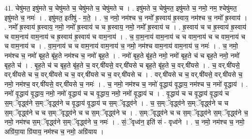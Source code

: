 \documentclass[17pt]{extarticle}
\begin{document}
41. चेषु॑मत॒ इषु॑मते च॒ चेषु॑मते च॒ चेषु॑मते च॒ चेषु॑मते च । . इषु॑मते च॒ चेषु॑मत॒ इषु॑मते च॒ नमो॒ नम॒ श्चेषु॑मत॒ इषु॑मते च॒ नमः॑ । . इषु॑मत॒ इतीषु॑ - म॒ते॒ । . च॒ नमो॒ नम॑श्च च॒ नमो᳚ ह्र॒स्वाय॑ ह्र॒स्वाय॒ नम॑श्च च॒ नमो᳚ ह्र॒स्वाय॑ । . नमो᳚ ह्र॒स्वाय॑ ह्र॒स्वाय॒ नमो॒ नमो᳚ ह्र॒स्वाय॑ च च ह्र॒स्वाय॒ नमो॒ नमो᳚ ह्र॒स्वाय॑ च । . ह्र॒स्वाय॑ च च ह्र॒स्वाय॑ ह्र॒स्वाय॑ च वाम॒नाय॑ वाम॒नाय॑ च ह्र॒स्वाय॑ ह्र॒स्वाय॑ च वाम॒नाय॑ । . च॒ वा॒म॒नाय॑ वाम॒नाय॑ च च वाम॒नाय॑ च च वाम॒नाय॑ च च वाम॒नाय॑ च । . वा॒म॒नाय॑ च च वाम॒नाय॑ वाम॒नाय॑ च॒ नमो॒ नम॑श्च वाम॒नाय॑ वाम॒नाय॑ च॒ नमः॑ । . च॒ नमो॒ नम॑श्च च॒ नमो॑ बृह॒ते बृ॑ह॒ते नम॑श्च च॒ नमो॑ बृह॒ते । . नमो॑ बृह॒ते बृ॑ह॒ते नमो॒ नमो॑ बृह॒ते च॑ च बृह॒ते नमो॒ नमो॑ बृह॒ते च॑ । . बृ॒ह॒ते च॑ च बृह॒ते बृ॑ह॒ते च॒ वर्.षी॑यसे॒ वर्.षी॑यसे च बृह॒ते बृ॑ह॒ते च॒ वर्.षी॑यसे । . च॒ वर्.षी॑यसे॒ वर्.षी॑यसे च च॒ वर्.षी॑यसे च च॒ वर्.षी॑यसे च च॒ वर्.षी॑यसे च । . वर्.षी॑यसे च च॒ वर्.षी॑यसे॒ वर्.षी॑यसे च॒ नमो॒ नम॑श्च॒ वर्.षी॑यसे॒ वर्.षी॑यसे च॒ नमः॑ । . च॒ नमो॒ नम॑श्च च॒ नमो॑ वृ॒द्धाय॑ वृ॒द्धाय॒ नम॑श्च च॒ नमो॑ वृ॒द्धाय॑ । . नमो॑ वृ॒द्धाय॑ वृ॒द्धाय॒ नमो॒ नमो॑ वृ॒द्धाय॑ च च वृ॒द्धाय॒ नमो॒ नमो॑ वृ॒द्धाय॑ च । . वृ॒द्धाय॑ च च वृ॒द्धाय॑ वृ॒द्धाय॑ च स॒म्ॅवृद्ध्व॑ने स॒म्ॅवृद्ध्व॑ने च वृ॒द्धाय॑ वृ॒द्धाय॑ च स॒म्ॅवृद्ध्व॑ने । . च॒ स॒म्ॅवृद्ध्व॑ने स॒म्ॅवृद्ध्व॑ने च च स॒म्ॅवृद्ध्व॑ने च च स॒म्ॅवृद्ध्व॑ने च च स॒म्ॅवृद्ध्व॑ने च । . स॒म्ॅवृद्ध्व॑ने च च स॒म्ॅवृद्ध्व॑ने स॒म्ॅवृद्ध्व॑ने च॒ नमो॒ नम॑श्च स॒म्ॅवृद्ध्व॑ने स॒म्ॅवृद्ध्व॑ने च॒ नमः॑ । . सं॒ॅवृध्व॑न॒ इति॑ सं - वृध्व॑ने । . च॒ नमो॒ नम॑श्च च॒ नमो॒ अग्रि॑या॒या ग्रि॑याय॒ नम॑श्च च॒ नमो॒ अग्रि॑याय । \newline
\pagebreak
{}
\end{document}
